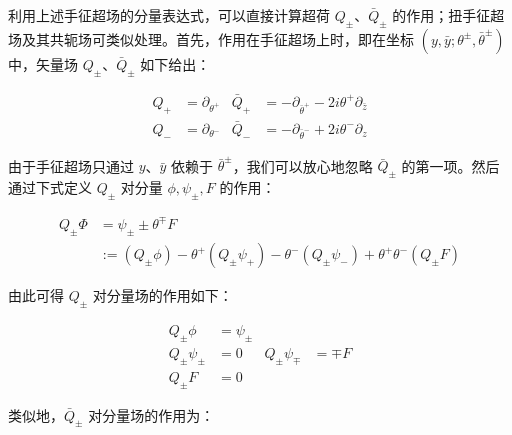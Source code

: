 利用上述手征超场的分量表达式，可以直接计算超荷 $Q_\pm$、$\bar Q_\pm$ 的作用；扭手征超场及其共轭场可类似处理。首先，作用在手征超场上时，即在坐标 $(y,\bar y;\theta^\pm,\bar\theta^\pm)$ 中，矢量场 $Q_\pm$、$\bar Q_\pm$ 如下给出：

\begin{equation}
\begin{aligned}
Q_+ &= \partial_{\theta^+} & \bar Q_+ &= -\partial_{\bar\theta^+} - 2i\theta^+\partial_{\bar z}\\
Q_- &= \partial_{\theta^-} & \bar Q_- &= -\partial_{\bar\theta^-} + 2i\theta^-\partial_z
\end{aligned}\tag{2.17}
\end{equation}

由于手征超场只通过 $y$、$\bar y$ 依赖于 $\bar\theta^\pm$，我们可以放心地忽略 $\bar Q_\pm$ 的第一项。然后通过下式定义 $Q_\pm$ 对分量 $\phi,\psi_\pm,F$ 的作用：

\begin{equation}
\begin{aligned}
Q_\pm\Phi &= \psi_\pm \pm \theta^\mp F\\
&:= (Q_\pm\phi) - \theta^+(Q_\pm\psi_+) - \theta^-(Q_\pm\psi_-) + \theta^+\theta^-(Q_\pm F)
\end{aligned}\tag{2.18}
\end{equation}

由此可得 $Q_\pm$ 对分量场的作用如下：

\begin{equation}
\begin{aligned}
Q_\pm\phi &= \psi_\pm\\
Q_\pm\psi_\pm &= 0 & Q_\pm\psi_\mp &= \mp F\\
Q_\pm F &= 0
\end{aligned}\tag{2.19}
\end{equation}

类似地，$\bar Q_\pm$ 对分量场的作用为：

